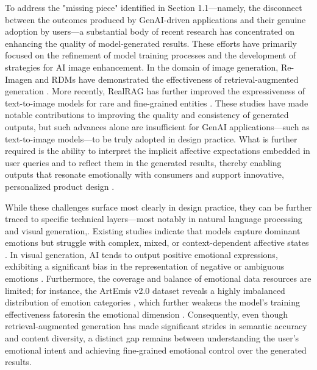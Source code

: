To address the "missing piece" identified in Section 1.1—namely, the disconnect between the outcomes produced by GenAI-driven applications and their genuine adoption by users—a substantial body of recent research has concentrated on enhancing the quality of model-generated results. These efforts have primarily focused on the refinement of model training processes and the development of strategies for AI image enhancement. In the domain of image generation, Re-Imagen \cite{chenReimagenRetrievalaugmentedTexttoimage2022} and RDMs \cite{blattmannRetrievalaugmentedDiffusionModels2022} have demonstrated the effectiveness of retrieval-augmented generation \cite{blattmannRetrievalaugmentedDiffusionModels2022,chenReimagenRetrievalaugmentedTexttoimage2022}. More recently, RealRAG \cite{lyuRealRAGRetrievalaugmentedRealistic2025} has further improved the expressiveness of text-to-image models for rare and fine-grained entities \cite{lyuRealRAGRetrievalaugmentedRealistic2025}. These studies have made notable contributions to improving the quality and consistency of generated outputs, but such advances alone are insufficient for GenAI applications—such as text-to-image models—to be truly adopted in design practice. What is further required is the ability to interpret the implicit affective expectations embedded in user queries and to reflect them in the generated results, thereby enabling outputs that resonate emotionally with consumers and support innovative, personalized product design \cite{yangEmotionallyIntelligentFashion2021}.

While these challenges surface most clearly in design practice, they can be further traced to specific technical layers—most notably in natural language processing and visual generation,. Existing studies indicate that models capture dominant emotions but struggle with complex, mixed, or context-dependent affective states \cite{acheampongTransformerModelsTextbased2021,finetLimitsAIUnderstanding2025}. In visual generation, AI tends to output positive emotional expressions, exhibiting a significant bias in the representation of negative or ambiguous emotions \cite{carrascoLevelAgreementEmotions2024,zhangDecodingEmotionalResponses2024}. Furthermore, the coverage and balance of emotional data resources are limited; for instance, the ArtEmis v2.0 dataset reveals a highly imbalanced distribution of emotion categories \cite{mohamedItOkayNot2022}, which further weakens the model's training effectiveness fatoresin the emotional dimension \cite{mohamedItOkayNot2022}. Consequently, even though retrieval-augmented generation has made significant strides in semantic accuracy and content diversity, a distinct gap remains between understanding the user's emotional intent and achieving fine-grained emotional control over the generated results.

